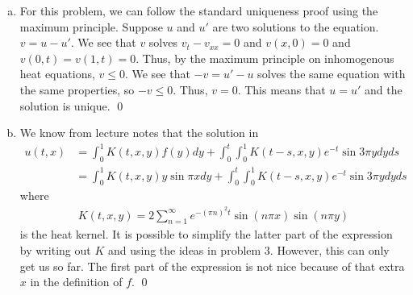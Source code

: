 \documentclass{article}
\begin{document}
\newpage
{}  \tri
\hop
\solution
\begin{enumerate}[(a)]
    \item For this problem, we can follow the standard uniqueness proof using the maximum principle. Suppose $u$ and $u'$ are two solutions to the equation. $v = u - u'$. We see that $v$ solves $v_t - v_{xx} = 0$ and $v(x,0) = 0$ and $v(0,t) = v(1,t) = 0$. Thus, by the maximum principle on inhomogenous heat equations, $v \le 0$. We see that $-v = u' - u$ solves the same equation with the same properties, so $-v \le 0$. Thus, $v= 0$. This means that $ u = u'$ and the solution is unique. \qed
    \item  We know from lecture notes that the solution in 
    \begin{align*}
        u(t,x) &= \int_0^1K(t,x,y)f(y)dy + \int_0^t\int_0^1 K(t-s,x,y)e^{-t}\sin 3\pi y dy ds \\
        &= \int_0^1K(t,x,y)y\sin \pi x dy + \int_0^t\int_0^1 K(t-s,x,y)e^{-t}\sin 3\pi y dy ds
    \end{align*}
    where 
    \begin{align*}
        K(t,x,y) = 2 \sum_{n=1}^\infty e^{-(\pi n)^2 t}\sin(n \pi x) \sin(n \pi y)
    \end{align*}
    is the heat kernel. It is possible to simplify the latter part of the expression by writing out $K$ and using the ideas in problem 3. However, this can only get us so far. The first part of the expression is not nice because of that extra $x$ in the definition of $f$. \qed
\end{enumerate}
\end{document}
